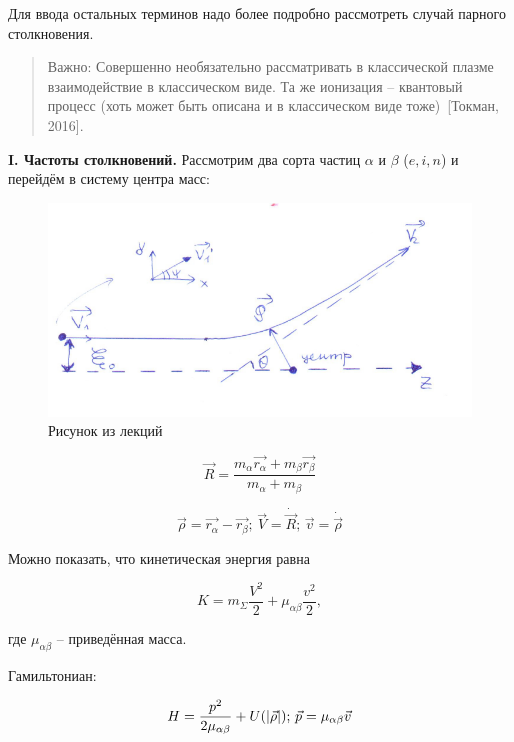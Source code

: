 \documentclass[10pt, a4paper]{article}
\newcommand{\Tokman}{~[Токман, 2016]}
\begin{document}
Для ввода остальных терминов надо более подробно рассмотреть случай парного столкновения.	

\begin{quotation}
	Важно: Совершенно необязательно рассматривать в классической плазме взаимодействие в классическом виде. Та же ионизация -- квантовый процесс (хоть может быть описана и в классическом виде тоже)\Tokman.
\end{quotation}

{\bfseries \large I. Частоты столкновений.} Рассмотрим два сорта частиц $\alpha$ и $\beta$ ($e, i, n$) и перейдём в систему центра масс:

\begin{figure}[ht]
	\begin{center}
		\includegraphics[width=0.6\linewidth]{scattering_simple.pdf}
	\end{center}
	\caption{Рисунок из лекций}
	\label{fig:scattering}
\end{figure}

\begin{equation} \label{eq:center_mass}
	\vec{R} = \frac{m_\alpha\vec{r_\alpha}+m_\beta\vec{r_\beta}}{m_\alpha+m_\beta}
\end{equation}

\begin{equation*}
	\vec{\rho} = \vec{r_\alpha}-\vec{r_\beta};\,
	\vec{V} = \dot{\vec{R}};\,
	\vec{v} = \dot{\vec{\rho}}
\end{equation*}

Можно показать, что кинетическая энергия равна

\begin{equation*}
	K = m_\Sigma\frac{V^2}{2}+\mu_{\alpha\beta}\frac{v^2}{2},
\end{equation*}

где $\mu_{\alpha\beta}$ -- приведённая масса. 

Гамильтониан:

\begin{equation*}
	H = \frac{p^2}{2\mu_{\alpha\beta}}+U(\abs{\vec{\rho}});\,
	\vec{p} = \mu_{\alpha\beta}\vec{v}
\end{equation*}
\end{document}
